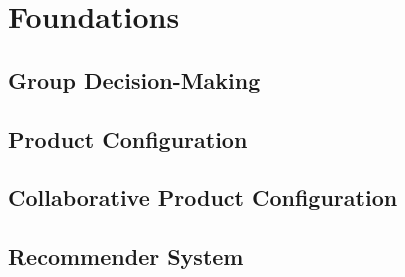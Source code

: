 \chapter{Foundations}
\label{ch:Foundations}

\section{Group Decision-Making}
\label{sec:Foundation:GroupDecisionMaking}


\section{Product Configuration}
\label{sec:Foundation:ProductConfiguration}


\section{Collaborative Product Configuration}
\label{sec:Foundation:CollaborativeProductConfiguration}


\section{Recommender System}
\label{sec:Foundation:RecommenderSystem}
